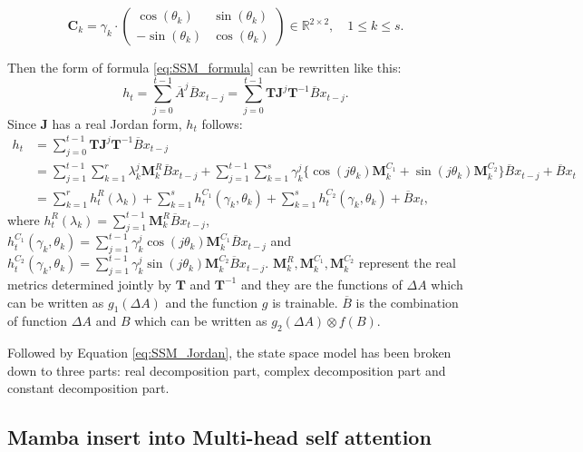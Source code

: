 $$
\boldsymbol{C}_k=\gamma_k \cdot\left(\begin{array}{cc}
\cos (\theta_k) & \sin (\theta_k) \\
-\sin (\theta_k) & \cos (\theta_k)
\end{array}\right) \in \mathbb{R}^{2 \times 2}, \quad 1 \leq k \leq s.
$$

Then the form of formula \eqref{eq:SSM_formula} can be rewritten like this: 
\begin{equation}
    h_t = \sum_{j=0}^{t-1} \overline{A}^j \overline{B} x_{t-j}=\sum_{j=0}^{t-1} \boldsymbol{T}\boldsymbol{J}^j \boldsymbol{T}^{-1}\overline{B} x_{t-j}.
\end{equation}
Since $\boldsymbol{J}$ has a real Jordan form, $h_t$ follows:
\begin{equation}
\label{eq:SSM_Jordan}
    \begin{aligned}
        h_t & = \sum_{j=0}^{t-1} \boldsymbol{T}\boldsymbol{J}^j \boldsymbol{T}^{-1}\overline{B} x_{t-j} \\
        & = \sum_{j=1}^{t-1}\sum_{k=1}^r \lambda_k^j \boldsymbol{M}_k^R \overline{B}x_{t-j}+\sum_{j=1}^{t-1}\sum_{k=1}^s \gamma_k^j \{\cos(j\theta_k)\boldsymbol{M}_k^{C_1}+\sin(j\theta_k)\boldsymbol{M}_k^{C_2}\} \overline{B}x_{t-j}+\overline{B}x_t \\
        & = \sum_{k=1}^r h_t^R(\lambda_k) + \sum_{k=1}^s h_t^{C_1}(\gamma_k,\theta_k)+\sum_{k=1}^s h_t^{C_2}(\gamma_k,\theta_k)+ \overline{B}x_t,
    \end{aligned}
\end{equation}
where $h_t^R(\lambda_k) = \sum_{j=1}^{t-1}\boldsymbol{M}_k^R \overline{B}x_{t-j}$, $h_t^{C_1}(\gamma_k,\theta_k)=\sum_{j=1}^{t-1}\gamma_k^j \cos(j\theta_k)\boldsymbol{M}_k^{C_1}\overline{B}x_{t-j}$ and $h_t^{C_2}(\gamma_k,\theta_k)=\sum_{j=1}^{t-1}\gamma_k^j \sin(j\theta_k)\boldsymbol{M}_k^{C_2}\overline{B}x_{t-j}$. $\boldsymbol{M}_k^R,\boldsymbol{M}_k^{C_1},\boldsymbol{M}_k^{C_2}$ represent the real metrics determined jointly by $\boldsymbol{T}$ and $\boldsymbol{T}^{-1}$ and they are the functions of $\Delta A$ which can be written as $g_1(\Delta A)$ and the function $g$ is trainable. $\overline{B}$ is the combination of function $\Delta A$ and $B$ which can be written as $g_2(\Delta A) \otimes f(B)$.

Followed by Equation \ref{eq:SSM_Jordan}, the state space model has been broken down to three parts: real decomposition part, complex decomposition part and constant decomposition part.

\subsection{Mamba insert into Multi-head self attention}

